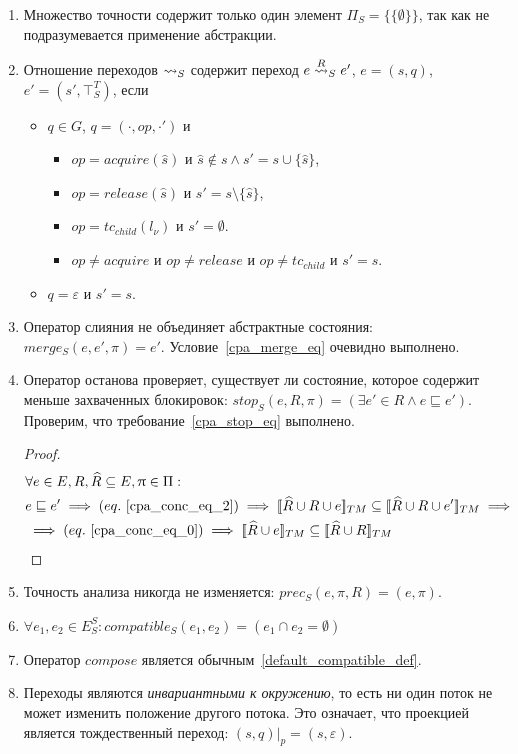 \begin{enumerate}
\item Множество точности содержит только один элемент $\Pi_S = \{\{\emptyset\}\}$, так как не подразумевается применение абстракции.

\item Отношение переходов $\leadsto_S$ содержит переход $e \stackrel{R}{\leadsto}_S e'$, $e = (s,q)$, $e' = (s', \top^T_S)$, если


\begin{itemize}
 \item $q \in G$, $q=(\cdot,op,\cdot')$ и 
\begin{itemize}
\item $op=acquire(\hat s)$ и $\hat s \notin s \land s' = s \cup \{\hat s\}$,
\item $op=release(\hat s)$ и $s' = s \setminus \{\hat s\}$,
\item $op=tc_{child}(l_\nu)$ и $s' = \emptyset$. 
\item $op \neq acquire$ и $op \neq release$ и $op \neq tc_{child}$ и $s' = s$.
\end{itemize}
 \item $q = \varepsilon$ и $s' = s$.
\end{itemize}

\item Оператор слияния не объединяет абстрактные состояния: $merge_S(e, e', \pi) = e'$. Условие~\ref{cpa_merge_eq} очевидно выполнено.

\item Оператор останова проверяет, существует ли состояние, которое содержит меньше захваченных блокировок: $stop_S(e, R, \pi) = (\exists e' \in R \land e \sqsubseteq e')$.
Проверим, что требование~\ref{cpa_stop_eq} выполнено.
\begin{proof}
\begin{align*}
&\forall e \in E, R, \widehat{R} \subseteq E, \pi \in \Pi: \\
& e \sqsubseteq e' \implies (eq.~\ref{cpa_conc_eq_2}) \implies \conctm{\widehat{R} \cup R \cup e} \subseteq \conctm{\widehat{R} \cup R \cup e'} \implies \\
& \implies (eq.~\ref{cpa_conc_eq_0}) \implies \conctm{\widehat{R} \cup e} \subseteq \conctm{\widehat{R} \cup R} 
\end{align*}
\end{proof}

\item Точность анализа никогда не изменяется: $prec_S(e, \pi, R) = (e, \pi)$.

\item $\forall e_1, e_2 \in E^S_S: compatible_S(e_1,e_2) = (e_1 \cap e_2 = \emptyset)$

\item Оператор $compose$ является обычным~\ref{default_compatible_def}.

\item Переходы являются {\em инвариантными к окружению}, то есть ни один поток не может изменить положение другого потока.
Это означает, что проекцией является тождественный переход:
$(s, q)|_p = (s, \varepsilon)$.
\end{enumerate}

